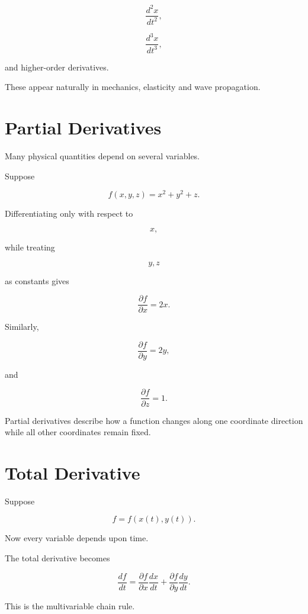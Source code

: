 \documentclass[11pt,a4paper,openany]{book}
\begin{document}
\[
\frac{d^2x}{dt^2},
\]

\[
\frac{d^3x}{dt^3},
\]

and higher-order derivatives.

These appear naturally in mechanics, elasticity and wave propagation.


\section{Partial Derivatives}

Many physical quantities depend on several variables.

Suppose

\[
f(x,y,z)=x^2+y^2+z.
\]

Differentiating only with respect to

\[
x,
\]

while treating

\[
y,z
\]

as constants gives

\[
\boxed{
	\frac{\partial f}{\partial x}=2x.
}
\]

Similarly,

\[
\frac{\partial f}{\partial y}=2y,
\]

and

\[
\frac{\partial f}{\partial z}=1.
\]

Partial derivatives describe how a function changes along one coordinate
direction while all other coordinates remain fixed.


\section{Total Derivative}

Suppose

\[
f=f(x(t),y(t)).
\]

Now every variable depends upon time.

The total derivative becomes

\[
\boxed{
	\frac{df}{dt}
	=
	\frac{\partial f}{\partial x}
	\frac{dx}{dt}
	+
	\frac{\partial f}{\partial y}
	\frac{dy}{dt}.
}
\]

This is the multivariable chain rule.

\end{document}
